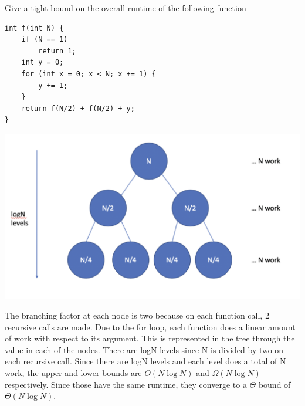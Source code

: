 \question Give a tight bound on the overall runtime of the following function


\begin{lstlisting}
int f(int N) {
	if (N == 1) 
		return 1;
	int y = 0;
	for (int x = 0; x < N; x += 1) {
		y += 1;
	}
	return f(N/2) + f(N/2) + y;
} 

\end{lstlisting}

\begin{solution}[1.5in]
\includegraphics[scale=0.35]{topics/asymptotics/MockMidterm/RuntimeTree.png}

The branching factor at each node is two because on each function call, 2 recursive calls are made. Due to the for loop, each function does a linear amount of work with respect to its argument. This is represented in the tree through the value in each of the nodes. There are logN levels since N is divided by two on each recursive call. Since there are logN levels and each level does a total of N work, the upper and lower bounds are $O(N\log N)$ and $\Omega(N\log N)$ respectively. Since those have the same runtime, they converge to a $\Theta$ bound of $\Theta(N\log N)$.

\end{solution}